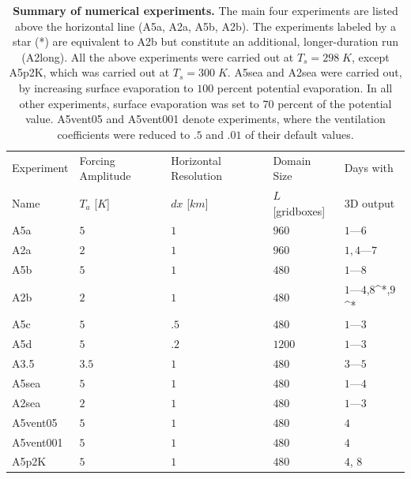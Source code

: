 \documentclass[draft,linenumbers]{agujournal2019}
\begin{document}
\begin{table}[b]
\begin{tabular}{lllll}
    Experiment & Forcing Amplitude & Horizontal Resolution & Domain Size & Days with\\
    Name & $T_a$ [$K$] & $dx$ [$km$] & $L$ [gridboxes] & 3D output\\
    \hline
    A5a & $5$ & $1$ & $960$ & $1$---$6$ \\
    A2a & $2$ & $1$ & $960$ & $1,4$---$7$ \\
    A5b & $5$ & $1$ & $480$ & $1$---$8$\\
    A2b & $2$ & $1$ & $480$ & $1$---$4$,$8$^*,$9$^*\\
    \hline
    A5c & $5$ & $.5$ & $480$ & $1$---$3$ \\
    A5d & $5$ & $.2$ & $1200$ & $1$---$3$ \\
    A3.5 & $3.5$ & $1$ & $480$ & $3$---$5$\\
    A5sea & $5$ & $1$ & $480$ & $1$---$4$\\
    A2sea & $2$ & $1$ & $480$ & $1$---$3$\\
    A5vent05 & $5$ & $1$ & $480$ & $4$\\
    A5vent001 & $5$ & $1$ & $480$ & $4$\\
    A5p2K & $5$ & $1$ & $480$ & $4$, $8$\\
    \hline
\end{tabular}
\caption{{\bf Summary of numerical experiments.}
The main four experiments are listed above the horizontal line (A5a, A2a, A5b, A2b). 
The experiments labeled by a star (*) are equivalent to A2b but constitute an additional, longer-duration run (A2long).
All the above experiments were carried out at $T_s=298\;K$, except A5p2K, which was carried out at $T_s=300\;K$. 
A5sea and A2sea were carried out, by increasing surface evaporation to $100$ percent potential evaporation.
In all other experiments, surface evaporation was set to 70 percent of the potential value.
A5vent05 and A5vent001 denote experiments, where the ventilation coefficients \cite{seifert2006two} were reduced to $.5$ and $.01$ of their default values. }
\label{tab:experiments}
\end{table}

\clearpage
\newpage
\pagebreak


%
%
%
%
\end{document}
